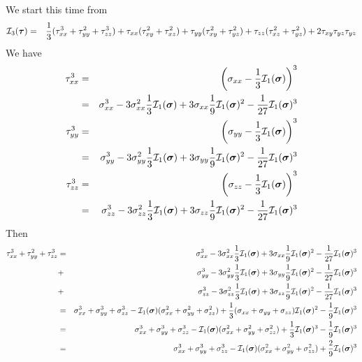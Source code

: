 We start this time from
\begin{eqnarray}
{\cal I}_3(\bm\tau) 
&=& 
\frac{1}{3}(\tau_{xx}^3 + \tau_{yy}^2 + \tau_{zz}^3) 
+\tau_{xx}(\tau_{xy}^2 + \tau_{xz}^2 ) 
+\tau_{yy}(\tau_{xy}^2 + \tau_{yz}^2 ) 
+\tau_{zz}(\tau_{xz}^2 + \tau_{yz}^2 ) 
+2\tau_{xy}\tau_{yz}\tau_{yz} \nonumber
\end{eqnarray}
We have
\begin{eqnarray}
\tau_{xx}^3 
&=& \left(\sigma_{xx}-\frac13 {\cal I}_1(\bm\sigma) \right)^3 \nonumber\\
&=& \sigma_{xx}^3 - 3\sigma_{xx}^2 \frac13 {\cal I}_1(\bm\sigma) 
+ 3 \sigma_{xx} \frac19  {\cal I}_1(\bm\sigma)^2 - \frac{1}{27} {\cal I}_1(\bm\sigma)^3  \nonumber\\
\tau_{yy}^3 
&=& \left(\sigma_{yy}-\frac13 {\cal I}_1(\bm\sigma) \right)^3 \nonumber\\
&=& \sigma_{yy}^3 - 3\sigma_{yy}^2 \frac13 {\cal I}_1(\bm\sigma) 
+ 3 \sigma_{yy} \frac19  {\cal I}_1(\bm\sigma)^2 - \frac{1}{27} {\cal I}_1(\bm\sigma)^3  \nonumber\\
\tau_{zz}^3 
&=& \left(\sigma_{zz}-\frac13 {\cal I}_1(\bm\sigma) \right)^3 \nonumber\\
&=& \sigma_{zz}^3 - 3\sigma_{zz}^2 \frac13 {\cal I}_1(\bm\sigma) 
+ 3 \sigma_{zz} \frac19  {\cal I}_1(\bm\sigma)^2 - \frac{1}{27} {\cal I}_1(\bm\sigma)^3  \nonumber
\end{eqnarray}
Then 
\begin{eqnarray}
\tau_{xx}^3 + \tau_{yy}^2 + \tau_{zz}^3 
&=&
\sigma_{xx}^3 - 3\sigma_{xx}^2 \frac13 {\cal I}_1(\bm\sigma) 
+ 3 \sigma_{xx} \frac19  {\cal I}_1(\bm\sigma)^2 - \frac{1}{27} {\cal I}_1(\bm\sigma)^3  \nonumber\\
&+& \sigma_{yy}^3 - 3\sigma_{yy}^2 \frac13 {\cal I}_1(\bm\sigma) 
+ 3 \sigma_{yy} \frac19  {\cal I}_1(\bm\sigma)^2 - \frac{1}{27} {\cal I}_1(\bm\sigma)^3  \nonumber\\
&+& \sigma_{zz}^3 - 3\sigma_{zz}^2 \frac13 {\cal I}_1(\bm\sigma) 
+ 3 \sigma_{zz} \frac19  {\cal I}_1(\bm\sigma)^2 - \frac{1}{27} {\cal I}_1(\bm\sigma)^3 \nonumber\\
&=&
\sigma_{xx}^3 + \sigma_{yy}^3 + \sigma_{zz}^3
-{\cal I}_1(\bm\sigma) (\sigma_{xx}^2+\sigma_{yy}^2+\sigma_{zz}^2)
+\frac13 (\sigma_{xx} + \sigma_{yy} + \sigma_{zz}) {\cal I}_1(\bm\sigma)^2
-\frac19 {\cal I}_1(\bm\sigma)^3 \nonumber\\
&=&
\sigma_{xx}^3 + \sigma_{yy}^3 + \sigma_{zz}^3
-{\cal I}_1(\bm\sigma) (\sigma_{xx}^2+\sigma_{yy}^2+\sigma_{zz}^2)
+\frac13 {\cal I}_1(\bm\sigma)^3
-\frac19 {\cal I}_1(\bm\sigma)^3 \nonumber\\
&=&
\sigma_{xx}^3 + \sigma_{yy}^3 + \sigma_{zz}^3
-{\cal I}_1(\bm\sigma) (\sigma_{xx}^2+\sigma_{yy}^2+\sigma_{zz}^2)
+\frac29 {\cal I}_1(\bm\sigma)^3 \nonumber
\end{eqnarray}

